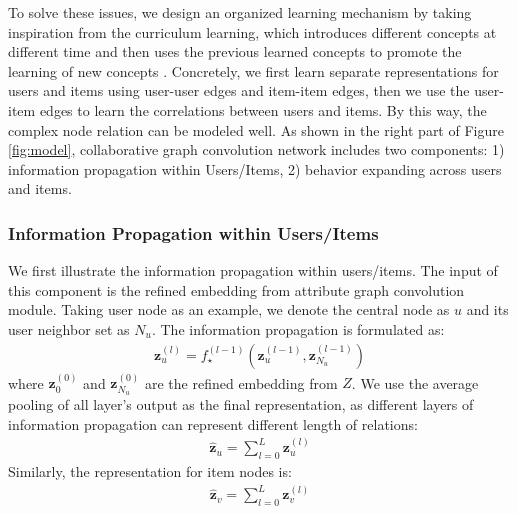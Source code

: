 To solve these issues, we design an organized learning mechanism by taking inspiration from the curriculum learning, which introduces different concepts at different time and then uses the previous learned concepts to promote the learning of new concepts \cite{bengio2009curriculum}.
Concretely, we first learn separate representations for users and items using user-user edges and item-item edges, then we use the user-item edges to learn the correlations between users and items. 
By this way, the complex node relation can be modeled well.
As shown in the right part of Figure \ref{fig:model}, collaborative graph convolution network includes two components: 1) information propagation within Users/Items, 2) behavior expanding across users and items. 


\subsubsection{Information Propagation within Users/Items}
We first illustrate the information propagation within users/items. The input of this component is the refined embedding from attribute graph convolution module.
Taking user node as an example, we denote the central node as $u$ and its user neighbor set as $N_u$. 
The information propagation is formulated as: 
\begin{align}
\textbf{z}_u^{(l)} = f_{\star}^{(l-1)}(\textbf{z}_u^{(l-1)}, \textbf{z}_{N_u}^{(l-1)})
\end{align}
where $\textbf{z}_0^{(0)}$ and $\textbf{z}_{N_u}^{(0)}$ are the refined embedding from $Z$.
We use the average pooling of all layer's output as the final representation, as different layers of information propagation can represent different length of relations:
\begin{align}
\hat{\textbf{z}}_u = \sum_{l=0}^{L}\textbf{z}_u^{(l)}
\end{align}
Similarly, the representation for item nodes is:
\begin{align}
\hat{\textbf{z}}_v = \sum_{l=0}^{L}\textbf{z}_v^{(l)}
\end{align}

